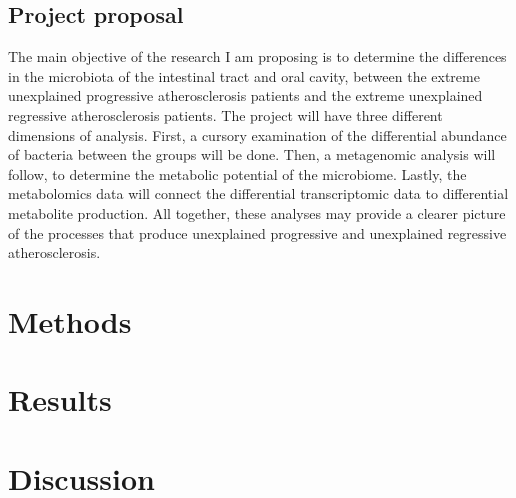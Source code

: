 \subsection{Project proposal}
The main objective of the research I am proposing is to determine the differences in the microbiota of the intestinal tract and oral cavity, between the extreme unexplained progressive atherosclerosis patients and the extreme unexplained regressive atherosclerosis patients. The project will have three different dimensions of analysis. First, a cursory examination of the differential abundance of bacteria between the groups will be done. Then, a metagenomic analysis will follow, to determine the metabolic potential of the microbiome. Lastly, the metabolomics data will connect the differential transcriptomic data to differential metabolite production. All together, these analyses may provide a clearer picture of the processes that produce unexplained progressive and unexplained regressive atherosclerosis.

\section{Methods}
\section{Results}
\section{Discussion}